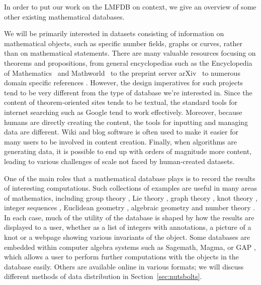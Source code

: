 \documentclass{amsart}
\begin{document}
In order to put our work on the LMFDB on context, we give an overview of some other existing mathematical databases.

We will be primarily interested in datasets consisting of information on mathematical objects, such as specific number fields, graphs or curves, rather than on mathematical statements.
There are many valuable resources focusing on theorems and propositions, from general encyclopedias such as the Encyclopedia of Mathematics~\cite{encofmath} and Mathworld~\cite{mathworld} to the preprint server arXiv~\cite{arxiv} to numerous domain specific references .
However, the design imperatives for such projects tend to be very different from the type of database we're interested in.
Since the content of theorem-oriented sites tends to be textual, the standard tools for internet searching such as Google tend to work effectively.
Moreover, because humans are directly creating the content, the tools for inputting and managing data are different.
Wiki  and blog \cite{fanosearch} software is often used to make it easier for many users to be involved in content creation.
Finally, when algorithms are generating data, it is possible to end up with orders of magnitude more content, leading to various challenges of scale not faced by human-created datasets.

One of the main roles that a mathematical database plays is to record the results of interesting computations.
Such collections of examples are useful in many areas of mathematics, including group theory , Lie theory , graph theory \cite{hog}, knot theory \cite{knotinfo}, integer sequences \cite{oeis}, Euclidean geometry \cite{etc}, algebraic geometry \cite{fanosearch} and number theory .
In each case, much of the utility of the database is shaped by how the results are displayed to a user, whether as a list of integers with annotations, a picture of a knot or a webpage showing various invariants of the object.
Some databases are embedded within computer algebra systems such as Sagemath, Magma, or GAP ,
which allows a user to perform further computations with the objects in the database easily.
Others are available online in various formats; we will discuss different methods of data distribution in Section~\ref{sec:nutsbolts}.
\end{document}
